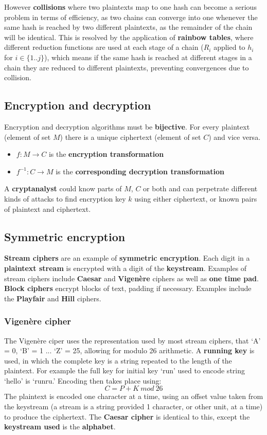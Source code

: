 \documentclass{article}
\newcommand{\np}{\vspace{8pt} \\}
\begin{document}
However \textbf{collisions} where two plaintexts map to one hash can become a serious problem in terms of efficiency, as two chains can converge into one whenever the same hash is reached by two different plaintexts, as the remainder of the chain will be identical. This is resolved by the application of \textbf{rainbow tables}, where different reduction functions are used at each stage of a chain ($ R_{i} $ applied to $ h_{i} $ for $ i \in \{1..j\} $), which means if the same hash is reached at different stages in a chain they are reduced to different plaintexts, preventing convergences due to collision.

\subsection{Encryption and decryption}
Encryption and decryption algorithms must be \textbf{bijective}. For every plaintext (element of set $ M $) there is a unique ciphertext (element of set $ C $) and vice versa.
\begin{itemize}
	\item $ f : M \rightarrow C $ is the \textbf{encryption transformation}
	\item $ f^{-1} : C \rightarrow M $ is the \textbf{corresponding decryption transformation}
\end{itemize}
A \textbf{cryptanalyst} could know parts of $ M $, $ C $ or both and can perpetrate different kinds of attacks to find encryption key $ k $ using either ciphertext, or known pairs of plaintext and ciphertext.

\subsection{Symmetric encryption}
\textbf{Stream ciphers} are an example of \textbf{symmetric encryption}. Each digit in a \textbf{plaintext stream} is encrypted with a digit of the \textbf{keystream}. Examples of stream ciphers include \textbf{Caesar} and \textbf{Vigen\`{e}re} ciphers as well as \textbf{one time pad}. \np
\textbf{Block ciphers} encrypt blocks of text, padding if necessary. Examples include the \textbf{Playfair} and \textbf{Hill} ciphers.

\subsubsection{Vigen\`{e}re cipher}
The Vigen\`{e}re ciper uses the representation used by most stream ciphers, that `A' = 0, `B' = 1 ... `Z' = 25, allowing for modulo 26 arithmetic. A \textbf{running key} is used, in which the complete key is a string repeated to the length of the plaintext. For example the full key for initial key `run' used to encode string `hello' is `runru.' Encoding then takes place using:
\[
	C = P + K\ mod\ 26
\]
The plaintext is encoded one character at a time, using an offset value taken from the keystream (a stream is a string provided 1 character, or other unit, at a time) to produce the ciphertext. The \textbf{Caesar cipher} is identical to this, except the \textbf{keystream used} is the \textbf{alphabet}.
\end{document}

